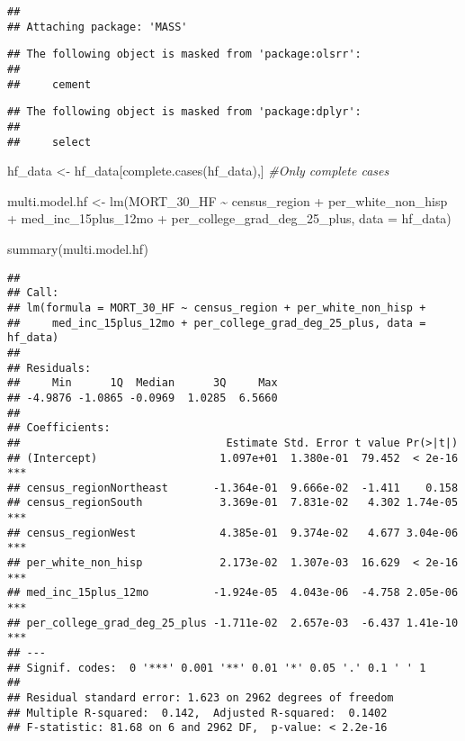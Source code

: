 \documentclass[
]{article}
\newenvironment{Shaded}{\begin{snugshade}}{\end{snugshade}}
\newcommand{\AttributeTok}[1]{\textcolor[rgb]{0.77,0.63,0.00}{#1}}
\newcommand{\CommentTok}[1]{\textcolor[rgb]{0.56,0.35,0.01}{\textit{#1}}}
\newcommand{\FunctionTok}[1]{\textcolor[rgb]{0.00,0.00,0.00}{#1}}
\newcommand{\NormalTok}[1]{#1}
\newcommand{\OtherTok}[1]{\textcolor[rgb]{0.56,0.35,0.01}{#1}}
\newcommand{\SpecialCharTok}[1]{\textcolor[rgb]{0.00,0.00,0.00}{#1}}
\begin{document}
\begin{verbatim}
## 
## Attaching package: 'MASS'
\end{verbatim}

\begin{verbatim}
## The following object is masked from 'package:olsrr':
## 
##     cement
\end{verbatim}

\begin{verbatim}
## The following object is masked from 'package:dplyr':
## 
##     select
\end{verbatim}

\begin{Shaded}
\begin{Highlighting}[]
\NormalTok{hf\_data }\OtherTok{\textless{}{-}}\NormalTok{ hf\_data[}\FunctionTok{complete.cases}\NormalTok{(hf\_data),] }\CommentTok{\#Only complete cases}

  
\NormalTok{multi.model.hf }\OtherTok{\textless{}{-}} \FunctionTok{lm}\NormalTok{(MORT\_30\_HF }\SpecialCharTok{\textasciitilde{}}\NormalTok{ census\_region }\SpecialCharTok{+}\NormalTok{ per\_white\_non\_hisp }\SpecialCharTok{+}
\NormalTok{                      med\_inc\_15plus\_12mo }\SpecialCharTok{+}\NormalTok{ per\_college\_grad\_deg\_25\_plus, }\AttributeTok{data =}\NormalTok{ hf\_data)}

\FunctionTok{summary}\NormalTok{(multi.model.hf)}
\end{Highlighting}
\end{Shaded}

\begin{verbatim}
## 
## Call:
## lm(formula = MORT_30_HF ~ census_region + per_white_non_hisp + 
##     med_inc_15plus_12mo + per_college_grad_deg_25_plus, data = hf_data)
## 
## Residuals:
##     Min      1Q  Median      3Q     Max 
## -4.9876 -1.0865 -0.0969  1.0285  6.5660 
## 
## Coefficients:
##                                Estimate Std. Error t value Pr(>|t|)    
## (Intercept)                   1.097e+01  1.380e-01  79.452  < 2e-16 ***
## census_regionNortheast       -1.364e-01  9.666e-02  -1.411    0.158    
## census_regionSouth            3.369e-01  7.831e-02   4.302 1.74e-05 ***
## census_regionWest             4.385e-01  9.374e-02   4.677 3.04e-06 ***
## per_white_non_hisp            2.173e-02  1.307e-03  16.629  < 2e-16 ***
## med_inc_15plus_12mo          -1.924e-05  4.043e-06  -4.758 2.05e-06 ***
## per_college_grad_deg_25_plus -1.711e-02  2.657e-03  -6.437 1.41e-10 ***
## ---
## Signif. codes:  0 '***' 0.001 '**' 0.01 '*' 0.05 '.' 0.1 ' ' 1
## 
## Residual standard error: 1.623 on 2962 degrees of freedom
## Multiple R-squared:  0.142,  Adjusted R-squared:  0.1402 
## F-statistic: 81.68 on 6 and 2962 DF,  p-value: < 2.2e-16
\end{verbatim}
\end{document}
